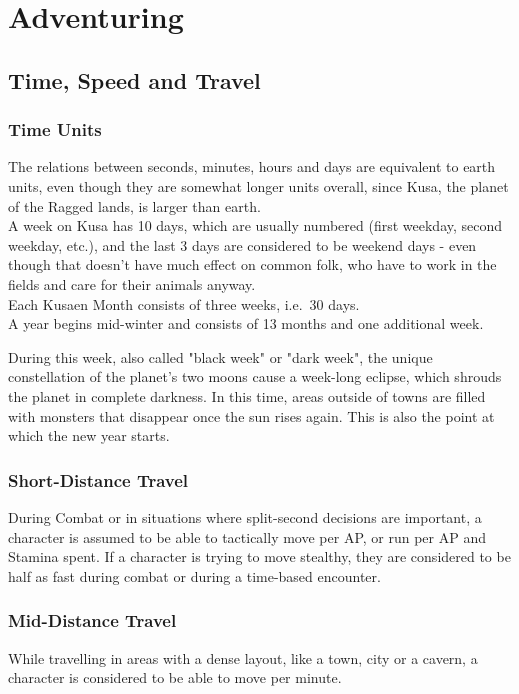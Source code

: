 \chapter{Adventuring}\label{ch:adventuring}
\section{Time, Speed and Travel}\label{sec:timeSpeedTravel}
\subsection{Time Units}\label{subsec:timeUnits}
The relations between seconds, minutes, hours and days are equivalent to earth units, even though they are somewhat longer units overall, since Kusa, the planet of the Ragged lands, is larger than earth.\\

A week on Kusa has 10 days, which are usually numbered (first weekday, second weekday, etc.), and the last 3 days are considered to be weekend days - even though that doesn't have much effect on common folk, who have to work in the fields and care for their animals anyway.\\

Each Kusaen Month consists of three weeks, i.e.\ 30 days.\\

A year begins mid-winter and consists of 13 months and one additional week.

During this week, also called "black week" or "dark week", the unique constellation of the planet's two moons cause a week-long eclipse, which shrouds the planet in complete darkness.
In this time, areas outside of towns are filled with monsters that disappear once the sun rises again.
This is also the point at which the new year starts.\\

\subsection{Short-Distance Travel}\label{subsec:shortDistanceTravel}
During Combat or in situations where split-second decisions are important, a character is assumed to be able to tactically move  per AP, or run  per AP and Stamina spent.
If a character is trying to move stealthy, they are considered to be half as fast during combat or during a time-based encounter.\\

\subsection{Mid-Distance Travel}\label{subsec:midDistanceTravel}
While travelling in areas with a dense layout, like a town, city or a cavern, a character is considered to be able to move  per minute.

